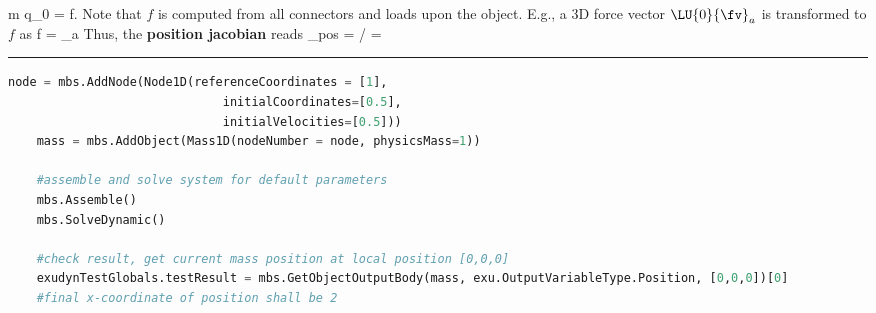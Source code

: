     \be 
      m \cdot \ddot q_0 = f.
    \ee
    Note that $f$ is computed from all connectors and loads upon the object. E.g., a 3D force vector $\LU{0}{\fv}_a$ is 
    transformed to $f$ as
    \be
      f =   _a
    \ee
    Thus, the {\bf position jacobian} reads 
    \be
      \Jm_{pos} = \partial \pv\cCur / \cCur = 
        
    \ee
\vspace{6pt}\par\noindent\rule{\textwidth}{0.4pt}
\label{miniExample_ObjectMass1D}
\pythonstyle
\begin{lstlisting}[language=Python, firstnumber=1]
    node = mbs.AddNode(Node1D(referenceCoordinates = [1], 
                              initialCoordinates=[0.5],
                              initialVelocities=[0.5]))
    mass = mbs.AddObject(Mass1D(nodeNumber = node, physicsMass=1))

    #assemble and solve system for default parameters
    mbs.Assemble()
    mbs.SolveDynamic()

    #check result, get current mass position at local position [0,0,0]
    exudynTestGlobals.testResult = mbs.GetObjectOutputBody(mass, exu.OutputVariableType.Position, [0,0,0])[0]
    #final x-coordinate of position shall be 2
\end{lstlisting}

